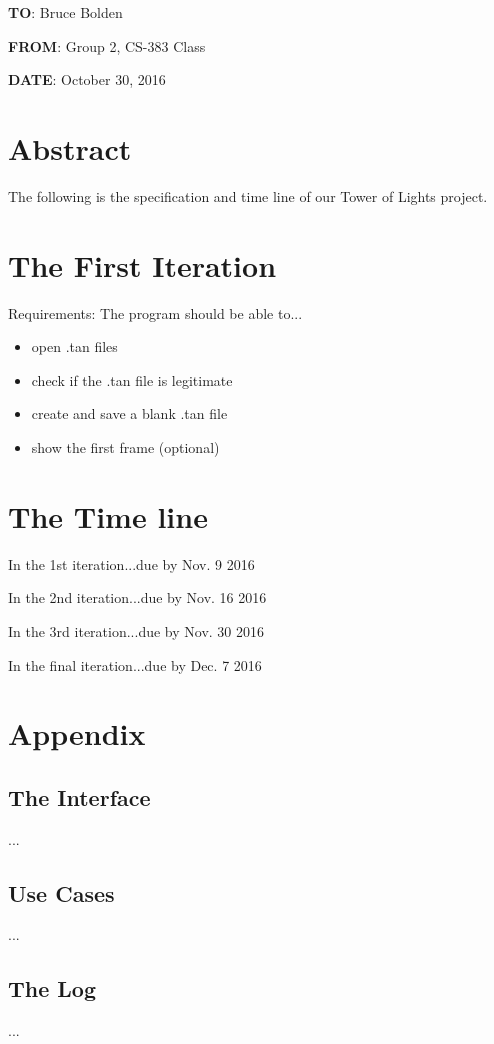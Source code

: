 \documentclass[12pt]{article}
\begin{document}
\noindent \textbf{TO}: Bruce Bolden\par 
\noindent
\textbf{FROM}: Group 2, CS-383 Class\par 
\noindent
\textbf{DATE}: October 30, 2016\par 
\noindent
\section*{Abstract}
The following is the specification and time line of our Tower of Lights project.
\section*{The First Iteration}
Requirements: The program should be able to...\begin{itemize}
\item{open .tan files}
\item{check if the .tan file is legitimate}
\item{create and save a blank .tan file}
\item{show the first frame (optional)}
\end{itemize}
\section*{The Time line}
In the 1st iteration...due by Nov. 9 2016\par 
\noindent
In the 2nd iteration...due by Nov. 16 2016\par 
\noindent
In the 3rd iteration...due by Nov. 30 2016\par 
\noindent
In the final iteration...due by Dec. 7 2016\par 
\noindent
\pagebreak
\noindent
\section*{Appendix}
\subsection*{The Interface}
...
\subsection*{Use Cases}
...
\subsection*{The Log}
...
\end{document}
